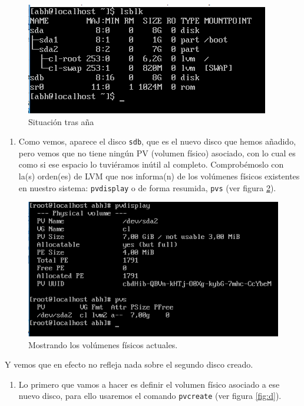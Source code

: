 \documentclass[
]{book}
\providecommand{\tightlist}{%
  \setlength{\itemsep}{0pt}\setlength{\parskip}{0pt}}
\begin{document}
\begin{figure}

{\centering \includegraphics[width=0.6\linewidth]{images/b} 

}

\caption{Situación tras aña}\label{fig:b}
\end{figure}

\begin{enumerate}
\def\labelenumi{\arabic{enumi}.}
\setcounter{enumi}{2}
\tightlist
\item
  Como vemos, aparece el disco \texttt{sdb}, que es el nuevo disco que hemos añadido, pero vemos que no tiene ningún PV (volumen físico) asociado, con lo cual es como si ese espacio lo tuviéramos inútil al completo. Comprobémoslo con la(s) orden(es) de LVM que nos informa(n) de los volúmenes físicos existentes en nuestro sistema: \texttt{pvdisplay} o de forma resumida, \texttt{pvs} (ver figura \ref{fig:c}).
\end{enumerate}

\begin{figure}

{\centering \includegraphics[width=0.6\linewidth]{images/c} 

}

\caption{Mostrando los volúmenes físicos actuales. }\label{fig:c}
\end{figure}

Y vemos que en efecto no refleja nada sobre el segundo disco creado.

\begin{enumerate}
\def\labelenumi{\arabic{enumi}.}
\setcounter{enumi}{3}
\tightlist
\item
  Lo primero que vamos a hacer es definir el volumen físico asociado a ese nuevo disco, para ello usaremos el comando \texttt{pvcreate} (ver figura \ref{fig:d}).
\end{enumerate}
\end{document}
